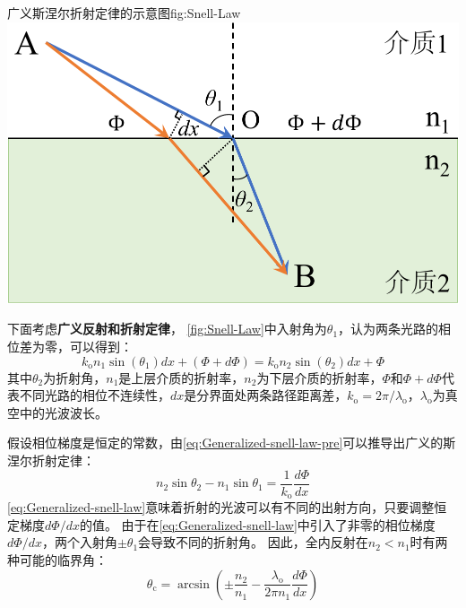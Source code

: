 \documentclass[supercite]{HustGraduPaper}
\begin{document}
\begin{generalfig}[htb]{广义斯涅尔折射定律的示意图}{fig:Snell-Law}
	\includegraphics[width=0.5\linewidth]{Figures/Snell-Law.pdf}
\end{generalfig}

下面考虑{\bfseries 广义反射和折射定律}，
\autoref{fig:Snell-Law}中入射角为$\theta_1$，认为两条光路的相位差为零，可以得到：
\begin{equation}
	k_\mathrm{o} n_1 \sin (\theta_1) dx + (\Phi + d\Phi) = k_\mathrm{o} n_2 \sin (\theta_2) dx + \Phi
	\label{eq:Generalized-snell-law-pre}
\end{equation}
其中$ \theta_2 $为折射角，$n_1$是上层介质的折射率，$n_2$为下层介质的折射率，$ \Phi $和$ \Phi + d\Phi $代表不同光路的相位不连续性，$ dx $是分界面处两条路径距离差，$k_\mathrm{o}=2 \pi / \lambda_\mathrm{o}$，$\lambda_\mathrm{o}$为真空中的光波波长。

假设相位梯度是恒定的常数，由\autoref{eq:Generalized-snell-law-pre}可以推导出广义的斯涅尔折射定律：
\begin{equation}
	n_2 \sin \theta_2 - n_1 \sin \theta_1 = \frac{1}{k_\mathrm{o}} \frac{d \Phi}{dx}
	\label{eq:Generalized-snell-law}
\end{equation}
\autoref{eq:Generalized-snell-law}意味着折射的光波可以有不同的出射方向，只要调整恒定梯度$d\Phi/dx$的值。
由于在\autoref{eq:Generalized-snell-law}中引入了非零的相位梯度$d\Phi/dx$，两个入射角$\pm \theta_1$会导致不同的折射角。
因此，全内反射在$n_2<n_1$时有两种可能的临界角：
\begin{equation}
	\theta_{\mathrm{c}}=\arcsin \left(\pm \frac{n_{2}}{n_{1}}-\frac{\lambda_{\mathrm{o}}}{2 \pi n_{1}} \frac{d \Phi}{d x}\right)
\end{equation}
\end{document}
